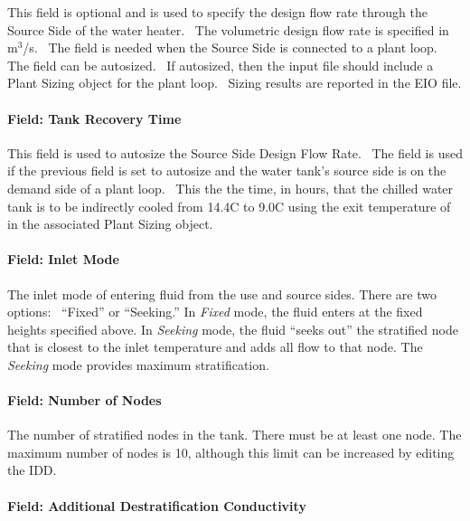 This field is optional and is used to specify the design flow rate through the Source Side of the water heater.~ The volumetric design flow rate is specified in m\(^{3}\)/s.~ The field is needed when the Source Side is connected to a plant loop.~ The field can be autosized.~ If autosized, then the input file should include a Plant Sizing object for the plant loop.~ Sizing results are reported in the EIO file.

\paragraph{Field: Tank Recovery Time}\label{field-tank-recovery-time-1}

This field is used to autosize the Source Side Design Flow Rate.~ The field is used if the previous field is set to autosize and the water tank's source side is on the demand side of a plant loop.~ This the the time, in hours, that the chilled water tank is to be indirectly cooled from 14.4C to 9.0C using the exit temperature of in the associated Plant Sizing object.

\paragraph{Field: Inlet Mode}\label{field-inlet-mode}

The inlet mode of entering fluid from the use and source sides. There are two options:~ ``Fixed'' or ``Seeking.'' In \emph{Fixed} mode, the fluid enters at the fixed heights specified above. In \emph{Seeking} mode, the fluid ``seeks out'' the stratified node that is closest to the inlet temperature and adds all flow to that node. The \emph{Seeking} mode provides maximum stratification.

\paragraph{Field: Number of Nodes}\label{field-number-of-nodes}

The number of stratified nodes in the tank. There must be at least one node. The maximum number of nodes is 10, although this limit can be increased by editing the IDD.

\paragraph{Field: Additional Destratification Conductivity}\label{field-additional-destratification-conductivity}

